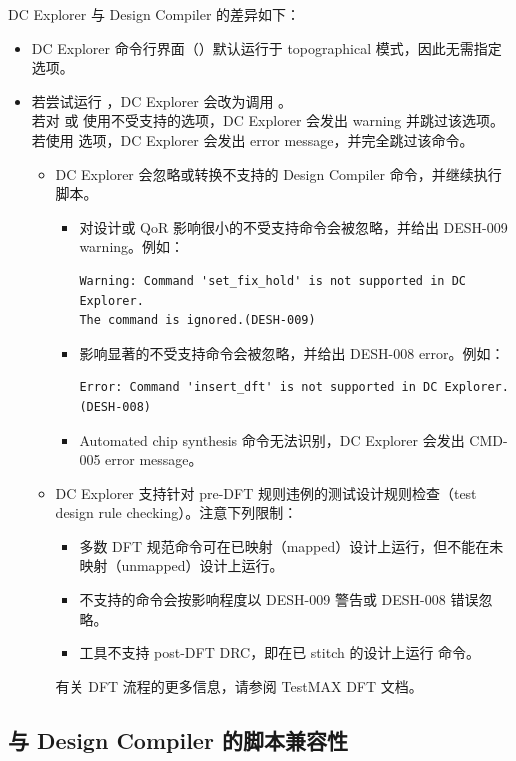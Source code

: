 DC Explorer 与 Design Compiler 的差异如下：
\begin{itemize}
  \item DC Explorer 命令行界面（）默认运行于 topographical 模式，因此无需指定  选项。
  \item 若尝试运行 ，DC Explorer 会改为调用 。\\
        若对  或  使用不受支持的选项，DC Explorer 会发出 warning 并跳过该选项。
        若使用  选项，DC Explorer 会发出 error message，并完全跳过该命令。
  \begin{itemize}
    \item DC Explorer 会忽略或转换不支持的 Design Compiler 命令，并继续执行脚本。
    \begin{itemize}
      \item 对设计或 QoR 影响很小的不受支持命令会被忽略，并给出 DESH-009 warning。例如：
\begin{lstlisting}
Warning: Command 'set_fix_hold' is not supported in DC Explorer.
The command is ignored.(DESH-009)
\end{lstlisting}
      \item 影响显著的不受支持命令会被忽略，并给出 DESH-008 error。例如：
\begin{lstlisting}
Error: Command 'insert_dft' is not supported in DC Explorer.
(DESH-008)
\end{lstlisting}
      \item Automated chip synthesis 命令无法识别，DC Explorer 会发出 CMD-005 error message。
    \end{itemize}
    \item DC Explorer 支持针对 pre-DFT 规则违例的测试设计规则检查（test design rule checking）。注意下列限制：
    \begin{itemize}
      \item 多数 DFT 规范命令可在已映射（mapped）设计上运行，但不能在未映射（unmapped）设计上运行。
      \item 不支持的命令会按影响程度以 DESH-009 警告或 DESH-008 错误忽略。
      \item 工具不支持 post-DFT DRC，即在已 stitch 的设计上运行  命令。
    \end{itemize}
    有关 DFT 流程的更多信息，请参阅 TestMAX DFT 文档。
  \end{itemize}
\end{itemize}

\subsection{与 Design Compiler 的脚本兼容性}
